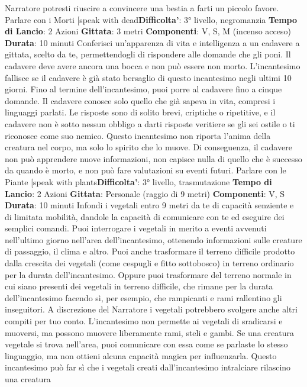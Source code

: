 \begin{multicols}{2}
Narratore potresti riuscire a convincere una bestia a farti un
piccolo favore.
Parlare con i Morti
[speak with dead\textbf{Difficolta'}:
3° livello, negromanzia
\textbf{Tempo di Lancio}: 2 Azioni
\textbf{Gittata}: 3 metri
\textbf{Componenti}: V, S, M (incenso acceso)
\textbf{Durata}: 10 minuti
Conferisci un’apparenza di vita e intelligenza a un
cadavere a gittata, scelto da te, permettendogli di
rispondere alle domande che gli poni. Il cadavere deve
avere ancora una bocca e non può essere non morto.
L’incantesimo fallisce se il cadavere è già stato
bersaglio di questo incantesimo negli ultimi 10 giorni.
Fino al termine dell’incantesimo, puoi porre al cadavere
fino a cinque domande. Il cadavere conosce solo quello
che già sapeva in vita, compresi i linguaggi parlati. Le
risposte sono di solito brevi, criptiche o ripetitive, e il
cadavere non è sotto nessun obbligo a darti risposte
veritiere se gli sei ostile o ti riconosce come suo
nemico. Questo incantesimo non riporta l’anima della
creatura nel corpo, ma solo lo spirito che lo muove. Di
conseguenza, il cadavere non può apprendere nuove
informazioni, non capisce nulla di quello che è
successo da quando è morto, e non può fare
valutazioni su eventi futuri.
Parlare con le Piante
[speak with plants\textbf{Difficolta'}:
3° livello, trasmutazione
\textbf{Tempo di Lancio}: 2 Azioni
\textbf{Gittata}: Personale (raggio di 9 metri)
\textbf{Componenti}: V, S
\textbf{Durata}: 10 minuti
Infondi i vegetali entro 9 metri da te di capacità
senziente e di limitata mobilità, dandole la capacità di
comunicare con te ed eseguire dei semplici comandi.
Puoi interrogare i vegetali in merito a eventi avvenuti
nell’ultimo giorno nell’area dell’incantesimo, ottenendo
informazioni sulle creature di passaggio, il clima e altro.
Puoi anche trasformare il terreno difficile prodotto dalla
crescita dei vegetali (come cespugli e fitto sottobosco)
in terreno ordinario per la durata dell’incantesimo.
Oppure puoi trasformare del terreno normale in cui
siano presenti dei vegetali in terreno difficile, che
rimane per la durata dell’incantesimo facendo sì, per
esempio, che rampicanti e rami rallentino gli inseguitori.
A discrezione del Narratore i vegetali potrebbero svolgere
anche altri compiti per tuo conto. L’incantesimo non
permette ai vegetali di sradicarsi e muoversi, ma
possono muovere liberamente rami, steli e gambi.
Se una creatura vegetale si trova nell’area, puoi
comunicare con essa come se parlaste lo stesso
linguaggio, ma non ottieni alcuna capacità magica per
influenzarla.
Questo incantesimo può far sì che i vegetali creati
dall’incantesimo intralciare rilascino una creatura

\end{multicols}
